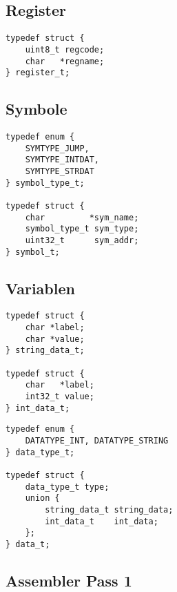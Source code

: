 \subsection{Register}

\begin{frame}[fragile]{\insertsubsection}
\begin{lstlisting}
typedef struct {
    uint8_t regcode;
    char   *regname;
} register_t;
\end{lstlisting}
\end{frame}

\subsection{Symbole}

\begin{frame}[fragile]{\insertsubsection}
\begin{lstlisting}
typedef enum {
    SYMTYPE_JUMP,
    SYMTYPE_INTDAT,
    SYMTYPE_STRDAT
} symbol_type_t;

typedef struct {
    char         *sym_name;
    symbol_type_t sym_type;
    uint32_t      sym_addr;
} symbol_t;
\end{lstlisting}
\end{frame}

\subsection{Variablen}

\begin{frame}[fragile]{\insertsubsection}
\begin{lstlisting}
typedef struct {
    char *label;
    char *value;
} string_data_t;

typedef struct {
    char   *label;
    int32_t value;
} int_data_t;
\end{lstlisting}
\end{frame}

\begin{frame}[fragile]{\insertsubsection}
\begin{lstlisting}
typedef enum {
    DATATYPE_INT, DATATYPE_STRING
} data_type_t;

typedef struct {
    data_type_t type;
    union {
        string_data_t string_data;
        int_data_t    int_data;
    };
} data_t;
\end{lstlisting}
\end{frame}

\subsection{Assembler Pass 1}

